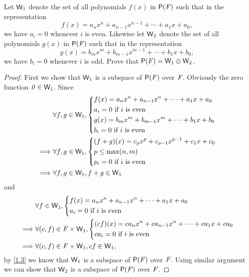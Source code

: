 \begin{ex}\label{ex:1.3.25}
  Let \(\mathsf{W}_1\) denote the set of all polynomials \(f(x)\) in \(\ps{\F}\) such that in the representation
  \[
    f(x) = a_n x^n + a_{n - 1} x^{n - 1} + \cdots + a_1 x + a_0,
  \]
  we have \(a_i = 0\) whenever \(i\) is even.
  Likewise let \(\mathsf{W}_2\) denote the set of all polynomials \(g(x)\) in \(\ps{\F}\) such that in the representation
  \[
    g(x) = b_m x^m + b_{m - 1} x^{m - 1} + \cdots + b_1 x + b_0,
  \]
  we have \(b_i = 0\) whenever \(i\) is odd.
  Prove that \(\ps{\F} = \W_1 \oplus \W_2\).
\end{ex}

\begin{proof}
  First we show that \(\mathsf{W}_1\) is a subspace of \(\ps{\F}\) over \(\mathit{F}\).
  Obviously the zero function \(\mathit{0} \in \mathsf{W}_1\).
  Since
  \begin{align*}
             & \forall f, g \in \mathsf{W}_1, \begin{dcases}
      f(x) = a_n x^n + a_{n - 1} x^n + \cdots + a_1 x + a_0 \\
      a_i = 0 \text{ if } i \text{ is even}                 \\
      g(x) = b_m x^m + b_{m - 1} x^m + \cdots + b_1 x + b_0 \\
      b_i = 0 \text{ if } i \text{ is even}
    \end{dcases} \\
    \implies & \forall f, g \in \mathsf{W}_1, \begin{dcases}
      (f + g)(x) = c_p x^p + c_{p - 1} x^{p - 1} + c_1 x + c_0 \\
      p \leq \max(n, m)                                        \\
      p_i = 0 \text{ if } i \text{ is even}
    \end{dcases} \\
    \implies & \forall f, g \in \mathsf{W}_1, f + g \in \mathsf{W}_1
  \end{align*}
  and
  \begin{align*}
             & \forall f \in \mathsf{W}_1, \begin{dcases}
      f(x) = a_n x^n + a_{n - 1} x^n + \cdots + a_1 x + a_0 \\
      a_i = 0 \text{ if } i \text{ is even}
    \end{dcases}                \\
    \implies & \forall (c, f) \in \mathit{F} \times \mathsf{W}_1, \begin{dcases}
      (cf)(x) = ca_n x^n + ca_{n - 1} x^n + \cdots + ca_1 x + ca_0 \\
      ca_i = 0 \text{ if } i \text{ is even}
    \end{dcases} \\
    \implies & \forall (c, f) \in \mathit{F} \times \mathsf{W}_1, cf \in \mathsf{W}_1,
  \end{align*}
  by \cref{1.3} we know that \(\mathsf{W}_1\) is a subspace of \(\ps{\F}\) over \(\mathit{F}\).
  Using similar argument we can show that \(\mathsf{W}_2\) is a subspace of \(\ps{\F}\) over \(\mathit{F}\).


\end{proof}

